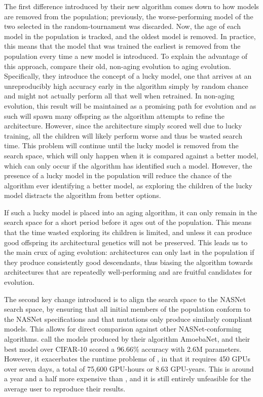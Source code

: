 The first difference introduced by their new algorithm comes down to how models are removed from the population; previously,
the worse-performing model of the two selected in the random-tournament was discarded. Now, the age of each model
in the population is tracked, and the oldest model is removed. In practice, this means that the model that was trained
the earliest is removed from the population every time a new model is introduced. To explain the advantage of this approach,
\citeauthor{real2018} compare their old, non-aging evolution to aging evolution. Specifically, they introduce the concept of a
lucky model, one that arrives at an unreproducibly high accuracy early in the algorithm simply by random chance and
might not actually perform all that well when retrained. In non-aging
evolution, this result will be maintained as a promising path for evolution and as such will spawn many offspring as
the algorithm attempts to refine the architecture. However, since the architecture simply scored well due to lucky
training, all the children will likely perform worse and thus be wasted search time. This problem will continue until
the lucky model is removed from the search space, which will only happen when it is compared against a better model, which
can only occur if the algorithm has identified such a model. However, the presence of a lucky model in the population
will reduce the chance of the algorithm ever identifying a better model, as exploring the children of the lucky model
distracts the algorithm from better options.

If such a lucky model is placed into an aging algorithm, it can only remain in the search space for a short period before
it ages out of the population. This means that the time wasted exploring its children is limited, and unless it can produce
good offspring its architectural genetics will not be preserved. This leads us to the main crux of aging evolution:
architectures can only last in the population if they produce consistently good descendants, thus biasing the algorithm
towards architectures that are repeatedly well-performing and are fruitful candidates for evolution.

The second key change introduced is to align the search space to the NASNet search space, by ensuring that all initial
members of the population conform to the NASNet specifications and that mutations only produce similarly compliant models.
This allows for direct comparison against other NASNet-conforming algorithms. \citeauthor{real2018} call the models produced by
their algorithm AmoebaNet, and their best model over CIFAR-10 scored a 96.66\% accuracy with 2.6M parameters. However,
it exacerbates the runtime problems of , in that it requires 450 GPUs over seven days, a total of 75,600
GPU-hours or 8.63 GPU-years. This is around a year and a half more expensive than , and it is still entirely
unfeasible for the average user to reproduce their results.

